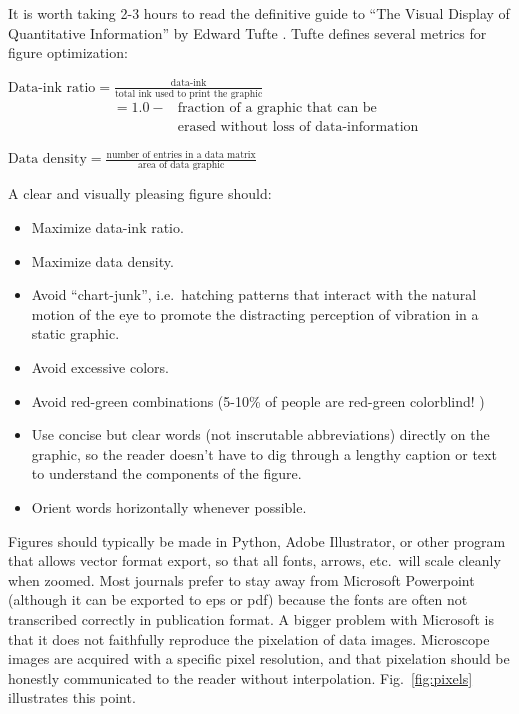 \documentclass[aps,prb,twocolumn,superscriptaddress,floatfix,longbibliography]{revtex4-2}
\newif\ifptitle
\newif\ifpnumber
\newcounter{para}
\newcommand\ptitle[1]{\par\refstepcounter{para}
{\ifpnumber{\noindent\textcolor{lightgray}{\textbf{\thepara}}\indent}\fi}
{\ifptitle{\textbf{[{#1}]}}\fi}}
\begin{document}
\ptitle{Figure style} It is worth taking 2-3 hours to read the definitive guide to ``The Visual Display of Quantitative Information'' by Edward Tufte \cite{TufteVisualDisplay2001}. Tufte defines several metrics for figure optimization:

\vspace{2mm}
\noindent $\displaystyle{\text{Data-ink ratio} = \frac{\text{data-ink}}{\text{total ink used to print the graphic}}}$
\vspace{-1mm}
\begin{eqnarray}
\nonumber & = 1.0 - & \text{fraction of a graphic that can be} \\[-2pt]
\nonumber & & \text{erased without loss of data-information}
\end{eqnarray}

\vspace{1mm}
\noindent $\displaystyle{\text{Data density} = \frac{\text{number of entries in a data matrix}}{\text{area of data graphic}}}$
\vspace{3mm}

\noindent A clear and visually pleasing figure should:
\begin{itemize}[label=$\Box$]
\item Maximize data-ink ratio.
\item Maximize data density.
\item Avoid ``chart-junk'', i.e.\ hatching patterns that interact with the natural motion of the eye to promote the distracting perception of vibration in a static graphic.
\item Avoid excessive colors.
\item Avoid red-green combinations (5-10\% of people are red-green colorblind! \cite{CrameriNatCom2020})
\item Use concise but clear words (not inscrutable abbreviations) directly on the graphic, so the reader doesn't have to dig through a lengthy caption or text to understand the components of the figure.
\item Orient words horizontally whenever possible.
\end{itemize}
\vspace{3mm}

\ptitle{Use vector format figures} Figures should typically be made in Python, Adobe Illustrator, or other program that allows vector format export, so that all fonts, arrows, etc.\ will scale cleanly when zoomed. Most journals prefer to stay away from Microsoft Powerpoint (although it can be exported to eps or pdf) because the fonts are often not transcribed correctly in publication format. A bigger problem with Microsoft is that it does not faithfully reproduce the pixelation of data images. Microscope images are acquired with a specific pixel resolution, and that pixelation should be honestly communicated to the reader without interpolation. Fig.\ \ref{fig:pixels} illustrates this point.
\end{document}
